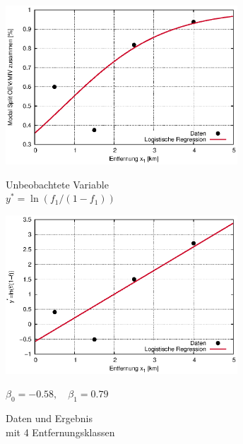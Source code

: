 \begin{landscape}
\begin{center}
{\begin{center}
\includegraphics[width=0.65\textwidth]{figsRegr/regr_logistic_WS1516cum_f.eps}
\end{center}
}
\hspace{1em}
\parbox{0.65\textwidth}{
\begin{center}
{\small
Unbeobachtete Variable\\ $y^*=\ln(f_1/(1-f_1))$\\
}
\vspace{1em}

\includegraphics[width=0.65\textwidth]{figsRegr/regr_logistic_WS1516cum.eps}
\end{center}
}

 {\small $ \beta_0=-0.58, \quad \beta_1=0.79 $}


\newpage

\vspace{1em}

\parbox{0.65\textwidth}{
\begin{center}
{\small
Daten und Ergebnis\\mit 4 Entfernungsklassen\\
}
\vspace{1em}


\end{center}}
\end{center}
\end{landscape}
